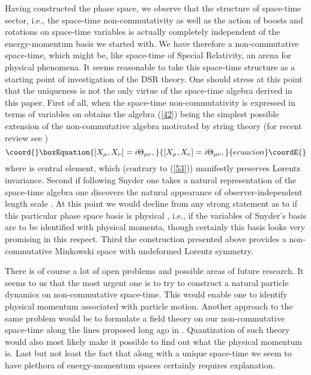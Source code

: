 \documentclass [prd,twocolumn,nofootinbib,showpacs]  {revtex4}
\begin{document}
Having constructed the phase space, we observe that the structure
of space-time sector, i.e.,  the space-time non-commutativity as
well as the action of boosts and rotations on space-time variables
is actually completely independent of the energy-momentum basis we
started with. We have therefore a non-commutative space-time,
which might be, like space-time of Special Relativity, an arena
for physical phenomena. It seems  reasonable to take this
space-time structure as a starting point of investigation of the
DSR theory. One should stress at this point that the uniqueness is
not the only virtue of the space-time algebra derived in this
paper. First of all, when the space-time non-commutativity is
expressed in terms of variables \coordHE{} on obtains the
algebra (\ref{42}) being the simplest possible extension of the
non-commutative algebra motivated by string theory (for recent
review see \cite{douglasnekrasov})
\begin{equation}\coord{}\boxEquation{\label{53}
  [X_\mu, X_\nu] = i \Theta_{\mu\nu},
}{[X_\mu, X_\nu] = i \Theta_{\mu\nu},
}{ecuacion}\coordE{}\end{equation}
where \myHighlight{$\Theta_{\mu\nu}$}\coordHE{} is central element, which  (contrary to
(\ref{53})) manifestly preserves  Lorentz invariance. Second if
following Snyder \cite{snyder} one takes a natural representation
of the space-time algebra one discovers the natural appearance of
observer-independent length scale \myHighlight{$\ell$}\coordHE{}. At this point we would
decline from any strong statement as to if this particular phase
space basis is physical , i.e., if the variables \coordHE{} of
Snyder's basis are to be identified with physical momenta, though
certainly this basis looks very promising in this respect. Third
the construction presented above provides a non-commutative
Minkowski space with undeformed Lorentz symmetry.

There is of course a lot of open problems and possible areas of
future research.  It seems to us that the most urgent one is to
try to construct a natural particle dynamics on non-commutative
space-time. This would enable one to identify physical momentum
associated with particle motion. Another approach to the same
problem would be to formulate a field theory on our
non-commutative space-time along the lines proposed long ago in
\cite{snyder2}. Quantization of such theory would also most likely
make it possible to find out what the physical momentum is. Last
but not least the fact that along with a unique space-time we seem
to have plethora of energy-momentum spaces certainly requires
explanation.
\end{document}
